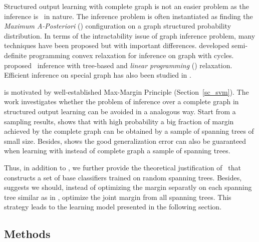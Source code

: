 {Structured output learning with complete graph is not an easier problem as the inference is \nphard\ in nature.
The inference problem is often instantiated as finding the \textit{Maximum A-Posteriori} (\map) configuration on a graph structured probability distribution.
In terms of the intractability issue of graph inference problem, many techniques have been proposed but with important differences.
\citet{Jordan04semiefinite} developed semi-definite programming convex relaxation for inference on graph with cycles.
\citet{Wainwright05map} proposed \map\ inference with tree-based and \textit{linear programming} (\lp) relaxation.
Efficient inference on special graph has also been studied in \citep{Globerson07approximate}.

 is motivated by well-established Max-Margin Principle (Section~\ref{sc_svm}).
The work investigates whether the problem of inference over a complete graph in structured output learning can be avoided in a analogous way.
Start from a sampling results,  shows that with high probability a big fraction of margin achieved by the complete graph can be obtained by a sample of spanning trees of small size.
Besides,  shows the good generalization error can also be guaranteed when learning with instead of complete graph a sample of spanning trees.

Thus, in addition to , we further provide the theoretical justification of \mam\ that constructs a set of base classifiers trained on random spanning trees. 
Besides,  suggests we should, instead of optimizing the margin separatly on each spanning tree similar as in \mam, optimize the joint margin from all spanning trees.
This strategy leads to the learning model presented in the following section.

\subsection{Methods}

}
